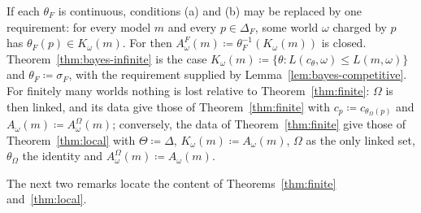 \documentclass[11pt]{article}
\theoremstyle{definition}
\theoremstyle{remark}
\begin{document}
If each $\theta_F$ is continuous, conditions (a) and (b) may be replaced by one requirement: for every model $m$ and every $p\in\Delta_F$, some world $\omega$ charged by $p$ has $\theta_F(p)\in K_\omega(m)$. For then $A^F_\omega(m)\coloneqq\theta_F^{-1}(K_\omega(m))$ is closed. Theorem~\ref{thm:bayes-infinite} is the case $K_\omega(m)\coloneqq\{\theta:L(c_\theta,\omega)\le L(m,\omega)\}$ and $\theta_F\coloneqq\sigma_F$, with the requirement supplied by Lemma~\ref{lem:bayes-competitive}. For finitely many worlds nothing is lost relative to Theorem~\ref{thm:finite}: $\Omega$ is then linked, and its data give those of Theorem~\ref{thm:finite} with $c_p\coloneqq c_{\theta_\Omega(p)}$ and $A_\omega(m)\coloneqq A^\Omega_\omega(m)$; conversely, the data of Theorem~\ref{thm:finite} give those of Theorem~\ref{thm:local} with $\Theta\coloneqq\Delta$, $K_\omega(m)\coloneqq A_\omega(m)$, $\Omega$ as the only linked set, $\theta_\Omega$ the identity and $A^\Omega_\omega(m)\coloneqq A_\omega(m)$.

The next two remarks locate the content of Theorems~\ref{thm:finite} and~\ref{thm:local}.
\end{document}
